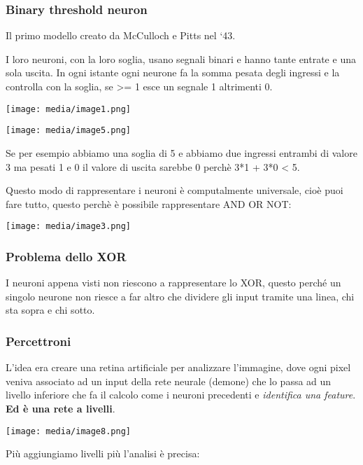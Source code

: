 \subsubsection{Binary threshold neuron}\label{binary-threshold-neuron}

Il primo modello creato da McCulloch e Pitts nel `43.

I loro neuroni, con la loro soglia, usano segnali binari e hanno tante
entrate e una sola uscita. In ogni istante ogni neurone fa la somma
pesata degli ingressi e la controlla con la soglia, se \textgreater= 1
esce un segnale 1 altrimenti 0.

\texttt{[image: media/image1.png]}

\texttt{[image: media/image5.png]}

Se per esempio abbiamo una soglia di 5 e abbiamo due ingressi entrambi
di valore 3 ma pesati 1 e 0 il valore di uscita sarebbe 0 perchè 3*1 +
3*0 \textless{} 5.

Questo modo di rappresentare i neuroni è computalmente universale, cioè
puoi fare tutto, questo perchè è possibile rappresentare AND OR NOT:

\texttt{[image: media/image3.png]}

\subsubsection{Problema dello XOR}\label{problema-dello-xor}

I neuroni appena visti non riescono a rappresentare lo XOR, questo
perché un singolo neurone non riesce a far altro che dividere gli input
tramite una linea, chi sta sopra e chi sotto.

\subsubsection{Percettroni}\label{percettroni}

L'idea era creare una retina artificiale per analizzare l'immagine, dove
ogni pixel veniva associato ad un input della rete neurale (demone) che
lo passa ad un livello inferiore che fa il calcolo come i neuroni
precedenti e \emph{identifica una feature}. \textbf{Ed è una rete a
livelli}.

\texttt{[image: media/image8.png]}

Più aggiungiamo livelli più l'analisi è precisa:

